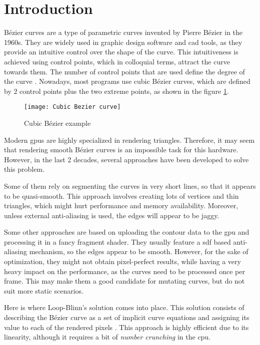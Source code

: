\documentclass[\topdir/main.tex]{subfiles}
\begin{document}
\section{Introduction}
Bézier curves are a type of parametric curves invented by Pierre Bézier in the 1960s. They are widely used in graphic design software and \gls{cad} tools, as they provide an intuitive control over the shape of the curve. This intuitiveness is achieved using control points, which in colloquial terms, attract the curve towards them. The number of control points that are used define the degree of the curve \cite{pomax:bezier}. Nowadays, most programs use cubic Bézier curves, which are defined by 2 control points plus the two extreme points, as shown in the figure \ref{fig:cubic}.\newline

\begin{figure}[hbtp]
    \centering
    \texttt{[image: Cubic Bezier curve]}
 
    \caption{Cubic Bézier example}
    \label{fig:cubic}
\end{figure}

Modern \glspl{gpu} are highly specialized in rendering triangles. Therefore, it may seem that rendering smooth Bézier curves is an impossible task for this hardware. However, in the last 2 decades, several approaches have been developed to solve this problem.\newline

Some of them rely on segmenting the curves in very short lines, so that it appears to be quasi-smooth. This approach involves creating lots of vertices and thin triangles, which might hurt performance and memory availability. Moreover, unless external anti-aliasing is used, the edges will appear to be jaggy.\newline

Some other approaches are based on uploading the contour data to the \gls{gpu} and processing it in a fancy fragment shader. They usually feature a \gls{sdf} based anti-aliasing mechanism, so the edges appear to be smooth. However, for the sake of optimization, they might not obtain pixel-perfect results, while having a very heavy impact on the performance, as the curves need to be processed once per frame. This may make them a good candidate for mutating curves, but do not suit more static scenarios.\newline

Here is where Loop-Blinn's solution comes into place. This solution consists of describing the Bézier curve as a set of implicit curve equations and assigning its value to each of the rendered pixels \cite{loopblinn2005}. This approach is highly efficient due to its linearity, although it requires a bit of \textit{number crunching} in the \gls{cpu}.\newline %
\end{document}
